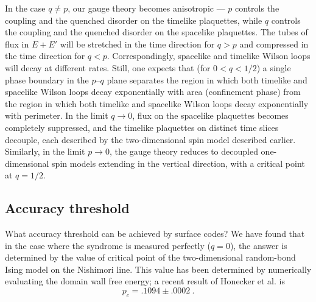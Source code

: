 In the case $q\ne p$, our gauge theory becomes anisotropic --- $p$ controls the coupling and the quenched disorder on the timelike plaquettes, while $q$ controls the coupling and the quenched disorder on the spacelike plaquettes. The tubes of flux in $E+E'$ will be stretched in the time direction for $q > p$ and compressed in the time direction for $q < p$. Correspondingly, spacelike and timelike Wilson loops will decay at different rates. Still, one expects that (for $0<q<1/2$) a single phase boundary in the $p$--$q$ plane separates the region in which both timelike and spacelike Wilson loops decay exponentially with  area (confinement phase) from the region in which both timelike and spacelike Wilson loops decay exponentially with perimeter. In the limit $q\to 0$, flux on the spacelike plaquettes becomes completely suppressed, and the timelike plaquettes on distinct time slices decouple, each described by the two-dimensional spin model described earlier. Similarly, in the limit $p\to 0$, the gauge theory reduces to decoupled one-dimensional spin models extending in the vertical direction, with a critical point at $q=1/2$.


\subsection {Accuracy threshold}
\label{subsec:acc_thresh}

What accuracy threshold can be achieved by surface codes? We have found that in the case where the syndrome is measured perfectly ($q=0$), the answer is determined by the value of critical point of the two-dimensional random-bond Ising model on the Nishimori line. This value has been determined by numerically evaluating the domain wall free energy; a recent result of Honecker et al. is \cite{honecker}
\begin{equation}
\label{eq:honecker}
p_c = .1094\pm .0002~.
\end{equation}

